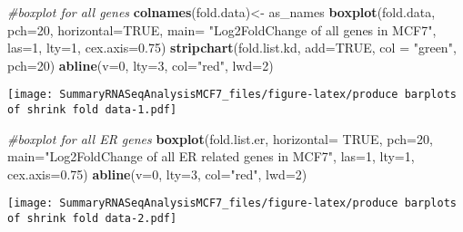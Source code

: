 \documentclass[]{article}
\newenvironment{Shaded}{\begin{snugshade}}{\end{snugshade}}
\newcommand{\KeywordTok}[1]{\textcolor[rgb]{0.13,0.29,0.53}{\textbf{#1}}}
\newcommand{\DataTypeTok}[1]{\textcolor[rgb]{0.13,0.29,0.53}{#1}}
\newcommand{\DecValTok}[1]{\textcolor[rgb]{0.00,0.00,0.81}{#1}}
\newcommand{\FloatTok}[1]{\textcolor[rgb]{0.00,0.00,0.81}{#1}}
\newcommand{\StringTok}[1]{\textcolor[rgb]{0.31,0.60,0.02}{#1}}
\newcommand{\CommentTok}[1]{\textcolor[rgb]{0.56,0.35,0.01}{\textit{#1}}}
\newcommand{\OtherTok}[1]{\textcolor[rgb]{0.56,0.35,0.01}{#1}}
\newcommand{\NormalTok}[1]{#1}
\begin{document}
\begin{Shaded}
\begin{Highlighting}[]
\CommentTok{#boxplot for all genes}
\KeywordTok{colnames}\NormalTok{(fold.data)<-}\StringTok{ }\NormalTok{as_names}
\KeywordTok{boxplot}\NormalTok{(fold.data, }\DataTypeTok{pch=}\DecValTok{20}\NormalTok{, }\DataTypeTok{horizontal=}\OtherTok{TRUE}\NormalTok{, }\DataTypeTok{main=} \StringTok{"Log2FoldChange of all genes in MCF7"}\NormalTok{, }\DataTypeTok{las=}\DecValTok{1}\NormalTok{, }\DataTypeTok{lty=}\DecValTok{1}\NormalTok{, }\DataTypeTok{cex.axis=}\FloatTok{0.75}\NormalTok{)}
\KeywordTok{stripchart}\NormalTok{(fold.list.kd, }\DataTypeTok{add=}\OtherTok{TRUE}\NormalTok{, }\DataTypeTok{col =} \StringTok{"green"}\NormalTok{, }\DataTypeTok{pch=}\DecValTok{20}\NormalTok{)}
\KeywordTok{abline}\NormalTok{(}\DataTypeTok{v=}\DecValTok{0}\NormalTok{, }\DataTypeTok{lty=}\DecValTok{3}\NormalTok{, }\DataTypeTok{col=}\StringTok{"red"}\NormalTok{, }\DataTypeTok{lwd=}\DecValTok{2}\NormalTok{)}
\end{Highlighting}
\end{Shaded}

\texttt{[image: SummaryRNASeqAnalysisMCF7\_files/figure-latex/produce barplots of shrink fold data-1.pdf]}

\begin{Shaded}
\begin{Highlighting}[]
\CommentTok{#boxplot for all ER genes}
\KeywordTok{boxplot}\NormalTok{(fold.list.er, }\DataTypeTok{horizontal=} \OtherTok{TRUE}\NormalTok{, }\DataTypeTok{pch=}\DecValTok{20}\NormalTok{, }\DataTypeTok{main=}\StringTok{"Log2FoldChange of all ER related genes in MCF7"}\NormalTok{, }\DataTypeTok{las=}\DecValTok{1}\NormalTok{, }\DataTypeTok{lty=}\DecValTok{1}\NormalTok{, }\DataTypeTok{cex.axis=}\FloatTok{0.75}\NormalTok{)}
\KeywordTok{abline}\NormalTok{(}\DataTypeTok{v=}\DecValTok{0}\NormalTok{, }\DataTypeTok{lty=}\DecValTok{3}\NormalTok{, }\DataTypeTok{col=}\StringTok{"red"}\NormalTok{, }\DataTypeTok{lwd=}\DecValTok{2}\NormalTok{)}
\end{Highlighting}
\end{Shaded}

\texttt{[image: SummaryRNASeqAnalysisMCF7\_files/figure-latex/produce barplots of shrink fold data-2.pdf]}
\end{document}
